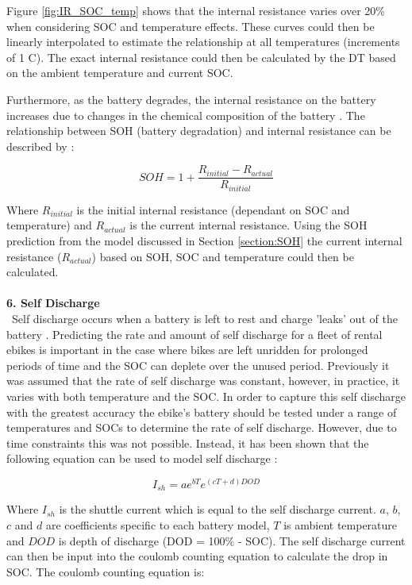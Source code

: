 \documentclass[a4paper, 10pt]{article}
\numberwithin{equation}{section}
\begin{document}
Figure \ref{fig:IR_SOC_temp} shows that the internal resistance varies over 20\% when considering SOC and temperature effects.
These curves could then be linearly interpolated to estimate the relationship at all temperatures (increments of 1 \degree C). The exact internal resistance could then be calculated by the DT based on the ambient temperature and current SOC.

Furthermore, as the battery degrades, the internal resistance on the battery increases due to changes in the chemical composition of the battery \cite{report:IR_deg}. The relationship between SOH (battery degradation) and internal resistance can be described by \cite{report:IR_SOH_eqn}:

\begin{equation}
    SOH = 1+ \frac{R_{initial}-R_{actual}}{R_{initial}}
\end{equation}

Where $R_{initial}$ is the initial internal resistance (dependant on SOC and temperature) and $R_{actual}$ is the current internal resistance\cite{report:IR_SOH_eqn}. Using the SOH prediction from the model discussed in Section \ref{section:SOH} the current internal resistance ($R_{actual}$) based on SOH, SOC and temperature could then be calculated. 
\\
\\
\textbf{6. Self Discharge}
\\
\
Self discharge occurs when a battery is left to rest and charge 'leaks' out of the battery \cite{report:SD_def}. Predicting the rate and amount of self discharge for a fleet of rental ebikes is important in the case where bikes are left unridden for prolonged periods of time and the SOC can deplete over the unused period. Previously it was assumed that the rate of self discharge was constant, however, in practice, it varies with both temperature and the SOC. In order to capture this self discharge with the greatest accuracy the ebike's battery should be tested under a range of temperatures and SOCs to determine the rate of self discharge. However, due to time constraints this was not possible. Instead, it has been shown that the following equation can be used to model self discharge \cite{report:SD_eqn}:

\begin{equation}
    I_{sh} = ae^{bT}e^{(cT+d)DOD}
\end{equation}

Where $I_{sh}$ is the shuttle current which is equal to the self discharge current. $a$, $b$, $c$ and $d$ are coefficients specific to each battery model, $T$ is ambient temperature and $DOD$ is depth of discharge (DOD = 100\% - SOC). The self discharge current can then be input into the coulomb counting equation to calculate the drop in SOC. The coulomb counting equation is:
\end{document}
